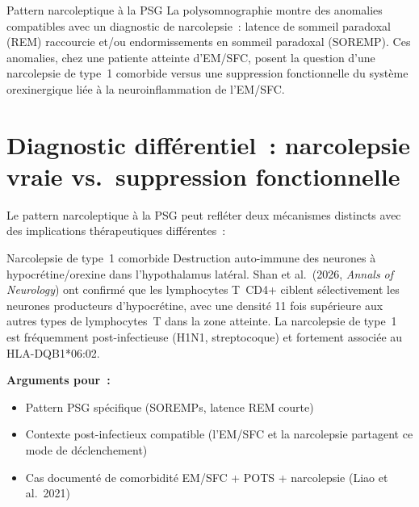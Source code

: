 \documentclass[11pt,a4paper]{article}
\begin{document}
\begin{keyfinding}{Pattern narcoleptique à la PSG}
La polysomnographie montre des anomalies compatibles avec un diagnostic de narcolepsie~: latence de sommeil paradoxal (REM) raccourcie et/ou endormissements en sommeil paradoxal (SOREMP). Ces anomalies, chez une patiente atteinte d'EM/SFC, posent la question d'une narcolepsie de type~1 comorbide versus une suppression fonctionnelle du système orexinergique liée à la neuroinflammation de l'EM/SFC.
\end{keyfinding}

\section{Diagnostic différentiel~: narcolepsie vraie vs.\ suppression fonctionnelle}
\label{sec:differentiel}

Le pattern narcoleptique à la PSG peut refléter deux mécanismes distincts avec des implications thérapeutiques différentes~:

\begin{hypothesis}{Narcolepsie de type~1 comorbide}
Destruction auto-immune des neurones à hypocrétine/orexine dans l'hypothalamus latéral. Shan et al.\ (2026, \textit{Annals of Neurology}) ont confirmé que les lymphocytes T~CD4+ ciblent sélectivement les neurones producteurs d'hypocrétine, avec une densité 11 fois supérieure aux autres types de lymphocytes~T dans la zone atteinte. La narcolepsie de type~1 est fréquemment post-infectieuse (H1N1, streptocoque) et fortement associée au HLA-DQB1*06:02.

\textbf{Arguments pour~:}
\begin{itemize}[nosep]
    \item Pattern PSG spécifique (SOREMPs, latence REM courte)
    \item Contexte post-infectieux compatible (l'EM/SFC et la narcolepsie partagent ce mode de déclenchement)
    \item Cas documenté de comorbidité EM/SFC + POTS + narcolepsie (Liao et al.\ 2021)
\end{itemize}
\end{hypothesis}
\end{document}
